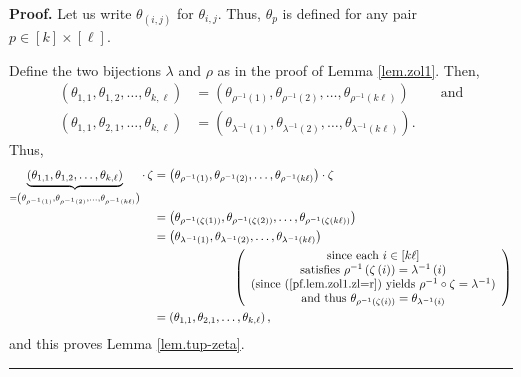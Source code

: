 \documentclass[numbers=enddot,12pt,final,onecolumn,notitlepage]{scrartcl}%
\theoremstyle{definition}
\newenvironment{proof}[1][Proof]{\noindent\textbf{#1.} }{\ \rule{0.5em}{0.5em}}
\begin{document}
\begin{proof}
Let us write $\theta_{\left(  i,j\right)  }$ for $\theta_{i,j}$. Thus,
$\theta_{p}$ is defined for any pair $p\in\left[  k\right]  \times\left[
\ell\right]  $.

Define the two bijections $\lambda$ and $\rho$ as in the proof of Lemma
\ref{lem.zol1}. Then,%
\begin{align*}
\left(  \theta_{1,1},\theta_{1,2},\ldots,\theta_{k,\ell}\right)   &  =\left(
\theta_{\rho^{-1}\left(  1\right)  },\theta_{\rho^{-1}\left(  2\right)
},\ldots,\theta_{\rho^{-1}\left(  k\ell\right)  }\right)
\ \ \ \ \ \ \ \ \ \ \text{and}\\
\left(  \theta_{1,1},\theta_{2,1},\ldots,\theta_{k,\ell}\right)   &  =\left(
\theta_{\lambda^{-1}\left(  1\right)  },\theta_{\lambda^{-1}\left(  2\right)
},\ldots,\theta_{\lambda^{-1}\left(  k\ell\right)  }\right)  .
\end{align*}
Thus,%
\begin{align*}
\underbrace{\left(  \theta_{1,1},\theta_{1,2},\ldots,\theta_{k,\ell}\right)
}_{=\left(  \theta_{\rho^{-1}\left(  1\right)  },\theta_{\rho^{-1}\left(
2\right)  },\ldots,\theta_{\rho^{-1}\left(  k\ell\right)  }\right)  }%
\cdot\,\zeta &  =\left(  \theta_{\rho^{-1}\left(  1\right)  },\theta
_{\rho^{-1}\left(  2\right)  },\ldots,\theta_{\rho^{-1}\left(  k\ell\right)
}\right)  \cdot\zeta\\
&  =\left(  \theta_{\rho^{-1}\left(  \zeta\left(  1\right)  \right)  }%
,\theta_{\rho^{-1}\left(  \zeta\left(  2\right)  \right)  },\ldots
,\theta_{\rho^{-1}\left(  \zeta\left(  k\ell\right)  \right)  }\right) \\
&  =\left(  \theta_{\lambda^{-1}\left(  1\right)  },\theta_{\lambda
^{-1}\left(  2\right)  },\ldots,\theta_{\lambda^{-1}\left(  k\ell\right)
}\right) \\
&  \ \ \ \ \ \ \ \ \ \ \ \ \ \ \ \ \ \ \ \ \left(
\begin{array}
[c]{c}%
\text{since each }i\in\left[  k\ell\right] \\
\text{satisfies }\rho^{-1}\left(  \zeta\left(  i\right)  \right)
=\lambda^{-1}\left(  i\right) \\
\text{(since (\ref{pf.lem.zol1.zl=r}) yields }\rho^{-1}\circ\zeta=\lambda
^{-1}\text{)}\\
\text{and thus }\theta_{\rho^{-1}\left(  \zeta\left(  i\right)  \right)
}=\theta_{\lambda^{-1}\left(  i\right)  }%
\end{array}
\right) \\
&  =\left(  \theta_{1,1},\theta_{2,1},\ldots,\theta_{k,\ell}\right)  ,
\end{align*}
and this proves Lemma \ref{lem.tup-zeta}.
\end{proof}
\end{document}

